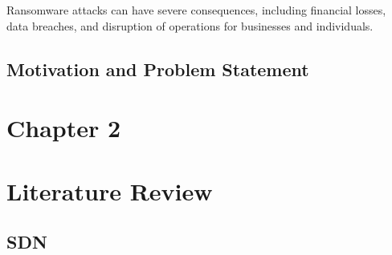 \documentclass[12pt,letterpaper]{article}
\begin{document}
    Ransomware attacks can have severe consequences, including financial losses, data breaches, and disruption of operations for businesses and individuals.

    \subsection{Motivation and Problem Statement}


\newpage
{}
\section*{Chapter 2}
\vspace*{1.2 cm}

    \section{Literature Review}




    \subsection{SDN}

    
\newpage
{}
    \printbibliography
\end{document}

